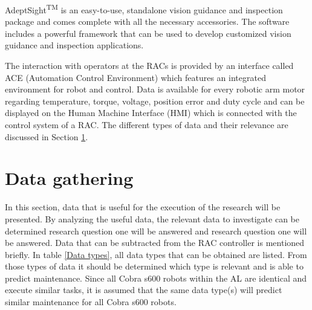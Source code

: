AdeptSight\textsuperscript{\tiny{TM}} is an easy-to-use, standalone vision guidance and inspection package and comes complete with all the necessary accessories. The software includes a powerful framework that can be used to develop customized vision guidance and inspection applications. 

The interaction with operators at the RACs is provided by an interface called ACE (Automation Control Environment) which features an integrated environment for robot and control. Data is available for every robotic arm motor regarding temperature, torque, voltage, position error and duty cycle and can be displayed on the Human Machine Interface (HMI) which is connected with the control system of a RAC. The different types of data and their relevance are discussed in Section \ref{Data Gathering}.

\section{Data gathering} \label{Data Gathering}
In this section, data that is useful for the execution of the research will be presented. By analyzing the useful data, the relevant data to investigate can be determined research question one will be answered and research question one will be answered. Data that can be subtracted from the RAC controller is mentioned briefly. In table \ref{Data types}, all data types that can be obtained are listed. From those types of data it should be determined which type is relevant and is able to predict  maintenance. Since all Cobra s600  robots within the AL are identical and execute similar tasks, it is assumed that the same data type(s) will predict similar maintenance for all Cobra s600 robots. 


